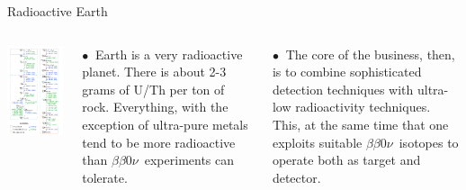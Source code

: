 \documentclass [aspectratio=169]{beamer}
\newcommand{\bbonu}{\ensuremath{\beta\beta0\nu}}
\begin{document}
\begin{frame}{Radioactive Earth}
\begin{columns}
\includegraphics[scale=0.40]{rchains.png}

$\bullet~$ Earth is a very radioactive planet. There is about 2-3 grams of U/Th per ton of rock. Everything, with the exception of ultra-pure metals tend to be more radioactive than \bbonu\ experiments can tolerate.   

$\bullet~$ The core of the business, then, is to combine sophisticated detection techniques with ultra-low radioactivity techniques. This, at the same time that one exploits suitable \bbonu\ isotopes to operate both as target and detector.   

\end{columns}
\end{frame}
\end{document}
